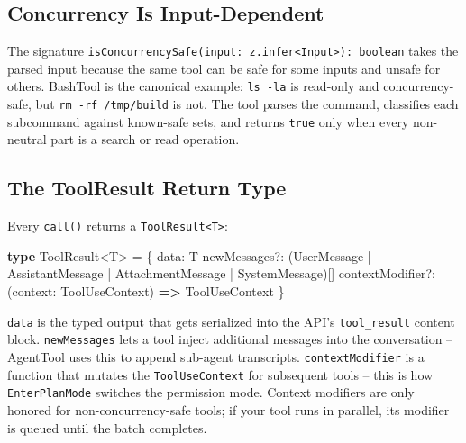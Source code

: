 \documentclass[
  english,
  11pt,
  letterpaper,
]{book}
\newenvironment{Shaded}{\begin{snugshade}}{\end{snugshade}}
\newcommand{\KeywordTok}[1]{\textcolor[rgb]{0.00,0.23,0.31}{\textbf{#1}}}
\newcommand{\NormalTok}[1]{\textcolor[rgb]{0.00,0.23,0.31}{#1}}
\newcommand{\OperatorTok}[1]{\textcolor[rgb]{0.37,0.37,0.37}{#1}}
\begin{document}
\subsection{Concurrency Is
Input-Dependent}\label{concurrency-is-input-dependent}

The signature
\texttt{isConcurrencySafe(input:\ z.infer\textless{}Input\textgreater{}):\ boolean}
takes the parsed input because the same tool can be safe for some inputs
and unsafe for others. BashTool is the canonical example:
\texttt{ls\ -la} is read-only and concurrency-safe, but
\texttt{rm\ -rf\ /tmp/build} is not. The tool parses the command,
classifies each subcommand against known-safe sets, and returns
\texttt{true} only when every non-neutral part is a search or read
operation.

\subsection{The ToolResult Return
Type}\label{the-toolresult-return-type}

Every \texttt{call()} returns a
\texttt{ToolResult\textless{}T\textgreater{}}:

\begin{Shaded}
\begin{Highlighting}[]
\KeywordTok{type}\NormalTok{ ToolResult}\OperatorTok{\textless{}}\NormalTok{T}\OperatorTok{\textgreater{}} \OperatorTok{=}\NormalTok{ \{}
\NormalTok{  data}\OperatorTok{:}\NormalTok{ T}
\NormalTok{  newMessages}\OperatorTok{?:}\NormalTok{ (UserMessage }\OperatorTok{|}\NormalTok{ AssistantMessage }\OperatorTok{|}\NormalTok{ AttachmentMessage }\OperatorTok{|}\NormalTok{ SystemMessage)[]}
\NormalTok{  contextModifier}\OperatorTok{?:}\NormalTok{ (context}\OperatorTok{:}\NormalTok{ ToolUseContext) }\KeywordTok{=\textgreater{}}\NormalTok{ ToolUseContext}
\NormalTok{\}}
\end{Highlighting}
\end{Shaded}

\texttt{data} is the typed output that gets serialized into the API's
\texttt{tool\_result} content block. \texttt{newMessages} lets a tool
inject additional messages into the conversation -- AgentTool uses this
to append sub-agent transcripts. \texttt{contextModifier} is a function
that mutates the \texttt{ToolUseContext} for subsequent tools -- this is
how \texttt{EnterPlanMode} switches the permission mode. Context
modifiers are only honored for non-concurrency-safe tools; if your tool
runs in parallel, its modifier is queued until the batch completes.
\end{document}
